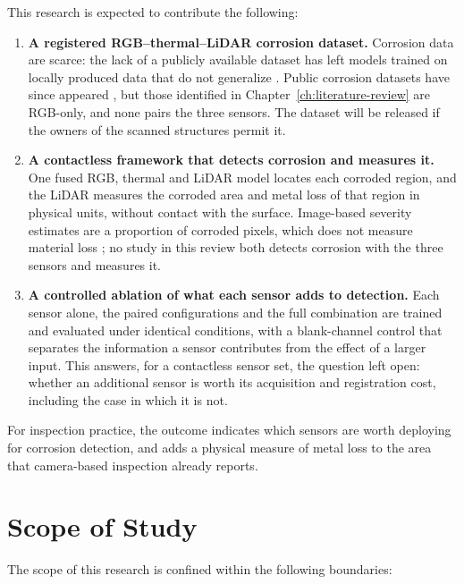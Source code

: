This research is expected to contribute the following:

\begin{enumerate}[label=\arabic*),leftmargin=*,itemsep=5pt]
  \item \textbf{A registered RGB--thermal--LiDAR corrosion dataset.}
        Corrosion data are scarce: the lack of a publicly available dataset
        has left models trained on locally produced data that do not
        generalize \citep{Nash2022}. Public corrosion datasets have since
        appeared \citep{Espinoza2026}, but those identified in
        Chapter~\ref{ch:literature-review} are RGB-only, and none pairs the
        three sensors. The dataset will be
        released if the owners of the scanned structures permit it.
  \item \textbf{A contactless framework that detects corrosion and measures
        it.} One fused RGB, thermal and LiDAR model locates each corroded
        region, and the LiDAR measures the corroded area and metal loss of that
        region in physical units, without contact with the surface. Image-based
        severity estimates are a proportion of corroded pixels, which does not
        measure material loss \citep{Alvani2026}; no study in this review both
        detects corrosion with the three sensors and measures it.
  \item \textbf{A controlled ablation of what each sensor adds to
        detection.} Each sensor alone, the paired configurations and the full
        combination are trained and evaluated under identical conditions, with
        a blank-channel control that separates the information a sensor
        contributes from the effect of a larger input. This answers, for a
        contactless sensor set, the question \citet{Haitz2022} left open:
        whether an additional sensor is worth its acquisition and registration
        cost, including the case in which it is not.
\end{enumerate}

For inspection practice, the outcome indicates which sensors are worth
deploying for corrosion detection, and adds a physical measure of metal loss to
the area that camera-based inspection already reports.

\section{Scope of Study}
\label{sec:scope}

The scope of this research is confined within the following boundaries:

